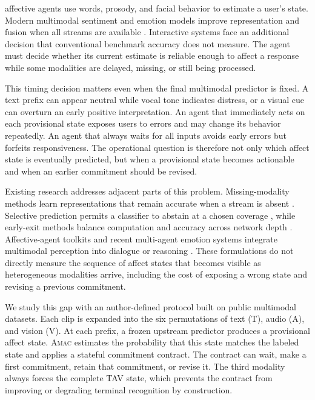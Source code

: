\documentclass[journal]{IEEEtran}
\newcommand{\method}{\textsc{Amac}}
\begin{document}
 affective agents use words, prosody, and facial behavior to estimate a user's state. Modern multimodal sentiment and emotion models improve representation and fusion when all streams are available \cite{tsai2019mult,hazarika2020misa,yu2021selfmm}. Interactive systems face an additional decision that conventional benchmark accuracy does not measure. The agent must decide whether its current estimate is reliable enough to affect a response while some modalities are delayed, missing, or still being processed.

This timing decision matters even when the final multimodal predictor is fixed. A text prefix can appear neutral while vocal tone indicates distress, or a visual cue can overturn an early positive interpretation. An agent that immediately acts on each provisional state exposes users to errors and may change its behavior repeatedly. An agent that always waits for all inputs avoids early errors but forfeits responsiveness. The operational question is therefore not only which affect state is eventually predicted, but when a provisional state becomes actionable and when an earlier commitment should be revised.

Existing research addresses adjacent parts of this problem. Missing-modality methods learn representations that remain accurate when a stream is absent \cite{lin2023missmodal,li2024umdf,huang2026recap,miyoshi2026dqf}. Selective prediction permits a classifier to abstain at a chosen coverage \cite{geifman2019selectivenet}, while early-exit methods balance computation and accuracy across network depth \cite{zhou2020pabee,jazbec2023anytime,jazbec2024risk}. Affective-agent toolkits and recent multi-agent emotion systems integrate multimodal perception into dialogue or reasoning \cite{li2020adviser,wang2026affectagent}. These formulations do not directly measure the sequence of affect states that becomes visible as heterogeneous modalities arrive, including the cost of exposing a wrong state and revising a previous commitment.

We study this gap with an author-defined protocol built on public multimodal datasets. Each clip is expanded into the six permutations of text (T), audio (A), and vision (V). At each prefix, a frozen upstream predictor produces a provisional affect state. \method{} estimates the probability that this state matches the labeled state and applies a stateful commitment contract. The contract can wait, make a first commitment, retain that commitment, or revise it. The third modality always forces the complete TAV state, which prevents the contract from improving or degrading terminal recognition by construction.
\end{document}
